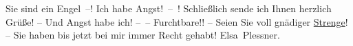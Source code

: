 \pstart
           Sie sind ein Engel –! Ich habe Angst! – ! Schließlich sende ich Ihnen herzlich Grüße! –
          Und Angst habe ich! – – Furchtbare!! – Seien Sie voll gnädiger \uline{Strenge}! – Sie haben bis jetzt bei mir immer Recht gehabt!\pend
           \pstart \spacefill\mbox{Elsa Plessner.}\pend{}\endnumbering{}  \newcommand{\dateiname}{L03721}\newcommand{\titel}{Elsa Plessner an Arthur Schnitzler, 21. 1. 1899}\newcommand{\editorInnen}{Selma Jahnke und Martin Anton Müller}
